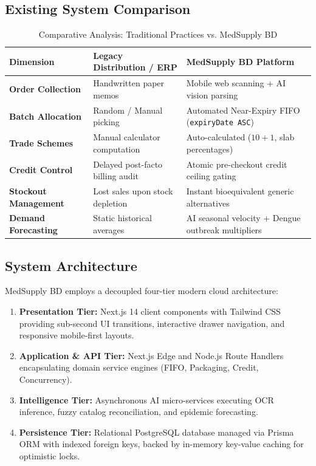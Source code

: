 \documentclass[12pt,a4paper]{article}
\begin{document}
\subsection{Existing System Comparison}
\begin{table}[h!]
\centering
\small
\begin{tabularx}{\textwidth}{p{3.5cm}p{4cm}X}
\toprule
\textbf{Dimension} & \textbf{Legacy Distribution / ERP} & \textbf{MedSupply BD Platform} \\
\midrule
\textbf{Order Collection} & Handwritten paper memos & Mobile web scanning + AI vision parsing \\
\addlinespace
\textbf{Batch Allocation} & Random / Manual picking & Automated Near-Expiry FIFO (\texttt{expiryDate ASC}) \\
\addlinespace
\textbf{Trade Schemes} & Manual calculator computation & Auto-calculated ($10+1$, slab percentages) \\
\addlinespace
\textbf{Credit Control} & Delayed post-facto billing audit & Atomic pre-checkout credit ceiling gating \\
\addlinespace
\textbf{Stockout Management} & Lost sales upon stock depletion & Instant bioequivalent generic alternatives \\
\addlinespace
\textbf{Demand Forecasting} & Static historical averages & AI seasonal velocity + Dengue outbreak multipliers \\
\bottomrule
\end{tabularx}
\caption{Comparative Analysis: Traditional Practices vs. MedSupply BD}
\end{table}

\subsection{System Architecture}
MedSupply BD employs a decoupled four-tier modern cloud architecture:
\begin{enumerate}
    \item \textbf{Presentation Tier:} Next.js 14 client components with Tailwind CSS providing sub-second UI transitions, interactive drawer navigation, and responsive mobile-first layouts.
    \item \textbf{Application \& API Tier:} Next.js Edge and Node.js Route Handlers encapsulating domain service engines (FIFO, Packaging, Credit, Concurrency).
    \item \textbf{Intelligence Tier:} Asynchronous AI micro-services executing OCR inference, fuzzy catalog reconciliation, and epidemic forecasting.
    \item \textbf{Persistence Tier:} Relational PostgreSQL database managed via Prisma ORM with indexed foreign keys, backed by in-memory key-value caching for optimistic locks.
\end{enumerate}
\end{document}
